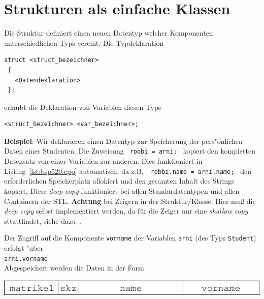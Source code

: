 %
%
\section{Strukturen als einfache Klassen}
\label{p:5.3}
%
%
Die Struktur definiert einen neuen Datentyp welcher Komponenten
unterschiedlichen Typs vereint. Die Typdeklaration

\mbox{}\hfill
\begin{minipage} {0.9\textwidth}
\begin{verbatim}
struct <struct_bezeichner>
 {
   <Datendeklaration>
 };
\end{verbatim}
\end{minipage}
\hfill\mbox{}

erlaubt die Deklaration von Variablen diesen Typs

\mbox{}\hfill
\begin{minipage} {0.9\textwidth}
\begin{verbatim}
<struct_bezeichner> <var_bezeichner>;
\end{verbatim}
\end{minipage}
\hfill\mbox{}

\textbf{Beispiel}: Wir deklarieren einen Datentyp zur Speicherung der
pers"onlichen Daten eines Studenten.
%
%
Die Zuweisung \verb| robbi = arni; | kopiert den kompletten Datensatz
von einer Variablen zur anderen. 
Dies funktioniert in Listing~\ref{lst:bsp520.cpp} automatisch, da z.B.\  
\verb| robbi.name = arni.name; | den erforderlichen Speicherplatz allokiert und den gesamten Inhalt des Strings kopiert.
Diese \emph{deep copy} funktioniert bei allen Standardatentypen und allen Containern der STL. 
%
\textbf{Achtung} bei Zeigern in der Struktur/Klasse. 
Hier muß die \emph{deep copy} selbst implementiert werden, da für die Zeiger nur eine \emph{shallow copy} sttattfindet, 
siehe dazu~\cite[p.~238f]{Breymann:2017:DCP}.
%

\noindent
Der Zugriff auf die Komponente \verb|vorname| der Variablen \verb|arni|
(des Typs \verb|Student|) erfolgt "uber
%
\\
\verb|arni.vorname|
\\[0.5ex]
%
Abgespeichert werden die Daten in der Form

% 
\centerline{\includegraphics[scale=0.9]{kap520.pdf}}


